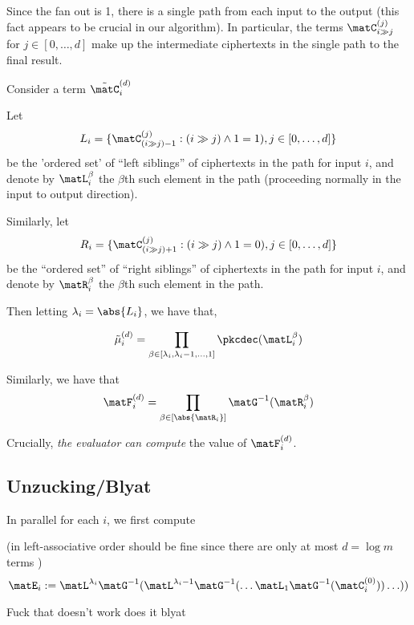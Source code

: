 
Since the fan out is 1, there is a single path from each input to the
output (this fact appears to be crucial in our algorithm). In
particular, the terms $\matC^{(j)}_{i \shiftright j}$ for $j \in
[0,\ldots,d]$ make up the intermediate ciphertexts in the single path
to the final result.

Consider a term $\tilde{\matC}^{(d)}_{i}$

Let \[L_{i} = \{\matC^{(j)}_{(i \shiftright j)-1} : (i \shiftright
  j)\wedge 1=1), j \in [0,\ldots,d]\}\]
be the 'ordered set' of ``left siblings'' of ciphertexts in the path
for input $i$, and denote by $\matL_{i}^{\beta}$ the $\beta$th such
element in the path (proceeding normally in the input to output
direction). 

Similarly, let \[R_{i} = \{\matC^{(j)}_{(i \shiftright j)+1} : (i \shiftright
  j)\wedge 1=0), j \in [0,\ldots,d]\} \] be the ``ordered
set'' of ``right siblings'' of
ciphertexts in the path for input $i$, and denote by $\matR_{i}^{\beta}$
the $\beta$th such element in the path. 

Then letting $\lambda_{i}=\abs{L_{i}}$, we have that, 

\begin{equation}\tilde{\mu}^{(d)}_{i}=\prod_{\beta \in
    [\lambda_{i},\lambda_{i}-1,\ldots,1]}
  \pkcdec(\matL_{i}^{\beta})\end{equation}



Similarly, we have that
\begin{equation}\matF^{(d)}_{i}=\prod_{\beta \in
    [\abs{\matR_{i}}]} \matG^{-1}(\matR_{i}^{\beta})\end{equation}

Crucially, \emph{the evaluator can compute} the value of
$\matF^{(d)}_{i}$. 




\subsection{Unzucking/Blyat}


In parallel for each $i$, we first compute 

(in left-associative order should be fine since there
are only at most $d=\log{m}$ terms ) 
\[\matE_{i}:=\matL^{\lambda_{i}}\matG^{-1}(\matL^{\lambda_{i}-1}\matG^{-1}(\ldots
  \matL_{1}\matG^{-1}(\matC^{(0)}_{i}))\ldots))\]


Fuck that doesn't work does it blyat



